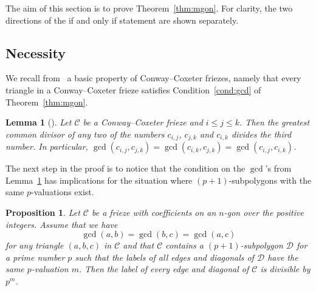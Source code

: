 \documentclass[10pt]{amsart}
\numberwithin{equation}{section}
\newtheorem{prop}[theo]{Proposition}
\newtheorem{lemm}[theo]{Lemma}
\theoremstyle{definition}
\theoremstyle{remark}
\begin{document}
The aim of this section is to prove Theorem~\ref{thm:mgon}.
For clarity, the two directions of the if and only if statement are shown separately.

\subsection{Necessity}
\label{sec:necessary}

We recall from~\cite{CHJ} a basic property of Conway--Coxeter friezes, namely that every triangle in a Conway--Coxeter frieze satisfies Condition~\eqref{cond:gcd} of Theorem~\ref{thm:mgon}.

\begin{lemm}[{\cite[Lemma~4.3]{CHJ}}] \label{lem:gcd}
Let $\mathcal{C}$ be a Conway--Coxeter frieze and $i\le j\le k$. 
Then the greatest common divisor of any two of the numbers $c_{i,j}$,
$c_{j,k}$ and $c_{i,k}$ divides the third number. In particular,
$\gcd(c_{i,j},c_{j,k})=\gcd(c_{i,k},c_{j,k})=\gcd(c_{i,j},c_{i,k})$.
\end{lemm}

The next step in the proof is to notice that the condition on the $\gcd$'s 
from Lemma~\ref{lem:gcd} has implications for the situation where 
$(p+1)$-subpolygons with the same $p$-valuations exist.

\begin{prop}\label{prop:pm}
Let $\mathcal{C}$ be a frieze with coefficients on an $n$-gon over the positive integers.
Assume that we have
\begin{equation}\label{cgcd}
\gcd(a,b)=\gcd(b,c)=\gcd(a,c)
\end{equation}
for any triangle $(a,b,c)$ in $\mathcal{C}$
and that $\mathcal{C}$ contains a $(p+1)$-subpolygon $\mathcal{D}$ for a prime number $p$
such that the labels of all edges and diagonals of $\mathcal{D}$ have the 
same $p$-valuation $m$.
Then the label of every edge and diagonal of $\mathcal{C}$ is divisible by $p^m$.
\end{prop}
\end{document}

